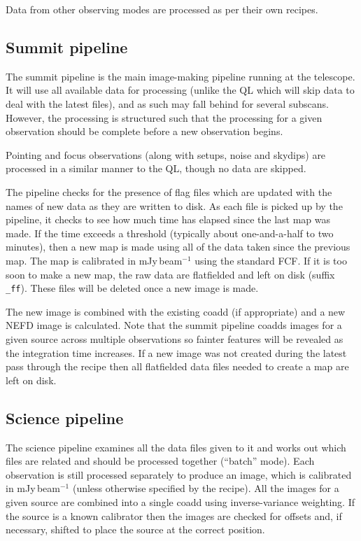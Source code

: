 \documentclass[twoside,11pt]{article}
\renewcommand{\_}{\texttt{\symbol{95}}}
\begin{document}
Data from other observing modes are processed as per their own recipes.

\subsection{Summit pipeline}

The summit pipeline is the main image-making pipeline running at the
telescope. It will use all available data for processing (unlike the
QL which will skip data to deal with the latest files), and as such
may fall behind for several subscans. However, the processing is
structured such that the processing for a given observation should be
complete before a new observation begins.

Pointing and focus observations (along with setups, noise and skydips)
are processed in a similar manner to the QL, though no data are
skipped.

The pipeline checks for the presence of flag files which are updated
with the names of new data as they are written to disk. As each file
is picked up by the pipeline, it checks to see how much time has
elapsed since the last map was made. If the time exceeds a threshold
(typically about one-and-a-half to two minutes), then a new map is
made using all of the data taken since the previous map. The map is
calibrated in mJy\,beam$^{-1}$ using the standard FCF. If it is too
soon to make a new map, the raw data are flatfielded and left on disk
(suffix \verb+_ff+). These files will be deleted once a new image is
made.

The new image is combined with the existing coadd (if appropriate) and
a new NEFD image is calculated. Note that the summit pipeline coadds
images for a given source across multiple observations so fainter
features will be revealed as the integration time increases. If a new
image was not created during the latest pass through the recipe then
all flatfielded data files needed to create a map are left on disk.

\subsection{Science pipeline}

The science pipeline examines all the data files given to it and works
out which files are related and should be processed together
(``batch'' mode). Each observation is still processed separately to
produce an image, which is calibrated in mJy\,beam$^{-1}$ (unless
otherwise specified by the recipe). All the images for a given source
are combined into a single coadd using inverse-variance weighting. If
the source is a known calibrator then the images are checked for
offsets and, if necessary, shifted to place the source at the correct
position.
\end{document}
